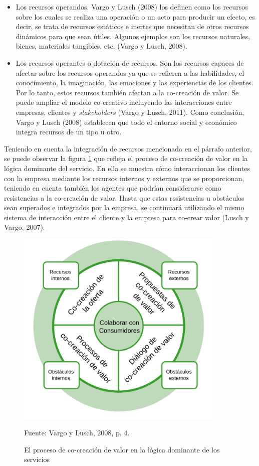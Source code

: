 \begin{itemize} 
			\item Los recursos operandos. Vargo y Lusch (2008) los definen como los recursos sobre los cuales se realiza una operación o un acto para producir un efecto, es decir, se trata de recursos estáticos e inertes que necesitan de otros recursos dinámicos para que sean útiles. Algunos ejemplos son los recursos naturales, bienes, materiales tangibles, etc. (Vargo y Lusch, 2008).
			\item Los recursos operantes o dotación de recursos. Son los recursos capaces de afectar sobre los recursos operandos ya que se refieren a las habilidades, el conocimiento, la imaginación, las emociones y las experiencias de los clientes. Por lo tanto, estos recursos también afectan a la co-creación de valor. Se puede ampliar el modelo co-creativo incluyendo las interacciones entre empresas, clientes y \emph{stakeholders} (Vargo y Lusch, 2011). Como conclusión, Vargo y Lusch (2008) establecen que todo el entorno social y económico integra recursos de un tipo u otro.

\end{itemize}

Teniendo en cuenta la integración de recursos mencionada en el párrafo anterior, se puede observar la figura \ref{fig:LDSVargoLusch} que refleja el proceso de co-creación de valor en la lógica dominante del servicio. En ella se muestra cómo interaccionan los clientes con la empresa mediante los recursos internos y externos que se proporcionan, teniendo en cuenta también los agentes que podrían considerarse como resistencias a la co-creación de valor. Hasta que estas resistencias u obstáculos sean superados e integrados por la empresa, se continuará utilizando el mismo sistema de interacción entre el cliente y la empresa para co-crear valor (Lusch y Vargo, 2007).

\begin{figure}[!h]
	\caption{El proceso de co-creación de valor en la lógica dominante de los servicios}
	\centering \includegraphics[width=100mm]{capitulos/graficos/LDSVargoLusch} 
	\label{fig:LDSVargoLusch} 

	\footnotesize
		Fuente: Vargo y Lusch, 2008, p. 4.
\end{figure}

